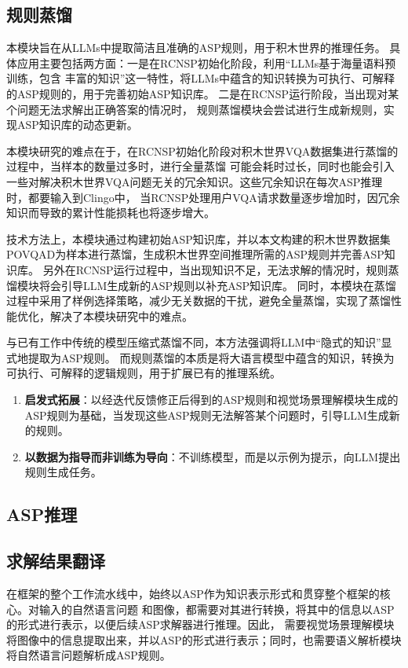 \subsection{规则蒸馏}
本模块旨在从LLMs中提取简洁且准确的ASP规则，用于积木世界的推理任务。
具体应用主要包括两方面：一是在RCNSP初始化阶段，利用“LLMs基于海量语料预训练，包含
丰富的知识”这一特性，将LLMs中蕴含的知识转换为可执行、可解释的ASP规则的，用于完善初始ASP知识库。
二是在RCNSP运行阶段，当出现对某个问题无法求解出正确答案的情况时，
规则蒸馏模块会尝试进行生成新规则，实现ASP知识库的动态更新。

本模块研究的难点在于，在RCNSP初始化阶段对积木世界VQA数据集进行蒸馏的过程中，当样本的数量过多时，进行全量蒸馏
可能会耗时过长，同时也能会引入一些对解决积木世界VQA问题无关的冗余知识。这些冗余知识在每次ASP推理时，都要输入到Clingo中，
当RCNSP处理用户VQA请求数量逐步增加时，因冗余知识而导致的累计性能损耗也将逐步增大。

技术方法上，本模块通过构建初始ASP知识库，并以本文构建的积木世界数据集POVQA\-D为样本进行蒸馏，生成积木世界空间推理所需的ASP规则并完善ASP知识库。
另外在RCNSP运行过程中，当出现知识不足，无法求解的情况时，规则蒸馏模块将会引导LLM生成新的ASP规则以补充ASP知识库。
同时，本模块在蒸馏过程中采用了样例选择策略，减少无关数据的干扰，避免全量蒸馏，实现了蒸馏性能优化，解决了本模块研究中的难点。

与已有工作中传统的模型压缩式蒸馏不同，本方法强调将LLM中“隐式的知识”显式地提取为ASP规则。
而规则蒸馏的本质是将大语言模型中蕴含的知识，转换为可执行、可解释的逻辑规则，用于扩展已有的推理系统。
\begin{enumerate}[nosep]
\item \textbf{启发式拓展}：以经迭代反馈修正后得到的ASP规则和视觉场景理解模块生成的ASP规则为基础，当发现这些ASP规则无法解答某个问题时，引导LLM生成新的规则。
\item \textbf{以数据为指导而非训练为导向}：不训练模型，而是以示例为提示，向LLM提出规则生成任务。
\end{enumerate}
\subsection{ASP推理}

\subsection{求解结果翻译}

在框架的整个工作流水线中，始终以ASP作为知识表示形式和贯穿整个框架的核心。对输入的自然语言问题
和图像，都需要对其进行转换，将其中的信息以ASP的形式进行表示，以便后续ASP求解器进行推理。因此，
需要视觉场景理解模块将图像中的信息提取出来，并以ASP的形式进行表示；同时，也需要语义解析模块
将自然语言问题解析成ASP规则。

